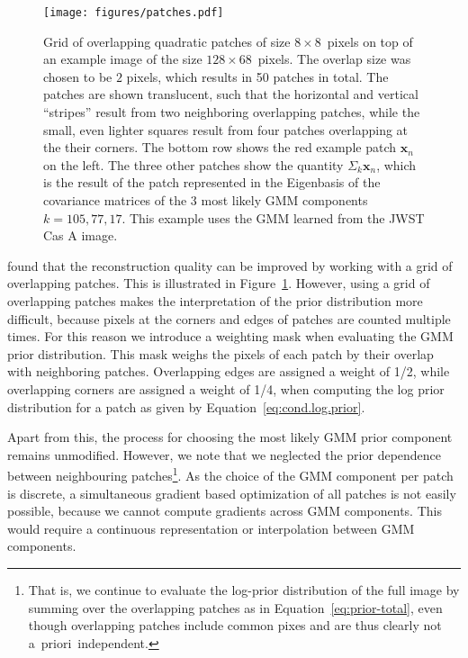 \documentclass[twocolumn]{aastex631}
\newcommand{\aprioir}{a~priori~}
\begin{document}
 \begin{figure}
        \begin{centering}
            \texttt{[image: figures/patches.pdf]}
            \caption{
                Grid of overlapping quadratic patches of size $8\times8$~pixels on top of an example image of the size $128 \times 68$~pixels. The overlap size was chosen to be $2$ pixels, which results in 50 patches in total. The patches are shown translucent, such that the horizontal and vertical \enquote{stripes} result from two neighboring overlapping patches, while the small, even lighter squares result from four patches overlapping at the their corners. The bottom row shows the red example patch $\mathbf{x}_n$ on the left. The three other patches show the quantity $\Sigma_{k} \mathbf{x}_n$, which is the result of the patch represented in the Eigenbasis of the covariance matrices of the 3 most likely GMM components $k = 105, 77, 17$. This example uses the GMM learned from the JWST Cas A image.
            }
            \label{fig:patches}
        \end{centering}
    \end{figure}


    \cite{Zoran2011} found that the reconstruction quality can be improved by working with a grid of overlapping patches. This is illustrated in Figure~\ref{fig:patches}. However, using a grid of overlapping patches makes the interpretation of the prior distribution more difficult, because pixels at the corners and edges of patches are counted multiple times. For this reason we introduce a weighting mask when evaluating the GMM prior distribution. This mask weighs the pixels of each patch by their overlap with neighboring patches. Overlapping edges are assigned a weight of 1/2, while overlapping corners are assigned a weight of 1/4, when computing the log prior distribution for a patch as given by Equation~\ref{eq:cond.log.prior}.
    
    Apart from this, the process for choosing the most likely GMM prior component remains unmodified. However, we note that we neglected the prior dependence between neighbouring patches\footnote{That is, we continue to evaluate the log-prior distribution of the full image by summing over the overlapping patches as in Equation~\ref{eq:prior-total}, even though overlapping patches include common pixes and are thus clearly not \aprioir independent.}. As the choice of the GMM component per patch is discrete, a simultaneous gradient based optimization of all patches is not easily possible, because we cannot compute gradients across GMM components. This would require a continuous representation or interpolation between GMM components.
   
\end{document}
